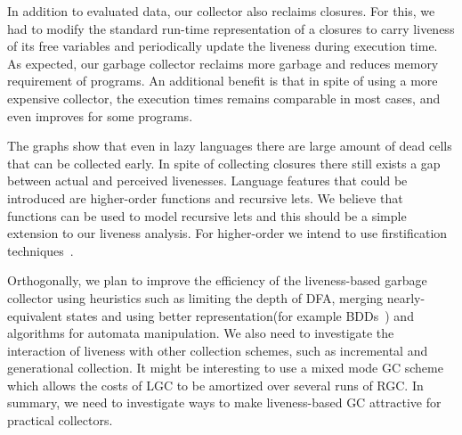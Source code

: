 \documentclass[9pt]{sigplanconf}
\begin{document}
In addition to  evaluated data, our collector  also reclaims closures.
For this, we  had to modify the standard run-time  representation of a
closures  to carry  liveness  of its free  variables and  periodically
update the liveness during execution  time.  As expected, our garbage
collector  reclaims more  garbage and  reduces memory  requirement of
programs.  An  additional benefit is  that in  spite of using  a more
expensive collector, the execution times remains comparable in
most cases, and even improves for some programs.


The graphs show that even in lazy languages there are large amount of
dead cells that can be collected early. In spite of collecting
closures there still exists a gap between actual and perceived
livenesses.
Language features that could be introduced are higher-order functions
and recursive lets. We believe that functions can be used to model
recursive lets and this should be a simple extension to our liveness
analysis.
For higher-order we intend to use firstification techniques~\cite{Mitchell:2009}. 
 

  Orthogonally, we  plan to  improve the  efficiency of
  the liveness-based garbage collector using heuristics
  such   as  limiting   the  depth   of  DFA,   merging
  nearly-equivalent    states    and    using    better
  representation(for example BDDs~\cite{Bryant86})    and    algorithms   for    automata
  manipulation.  We   also  need  to   investigate  the
  interaction   of  liveness   with  other   collection
  schemes,   such  as   incremental  and   generational
  collection.  It might be interesting to use a mixed mode GC
  scheme which allows the costs of LGC to be amortized over several runs
  of RGC. In summary, we  need to investigate ways
  to make liveness-based GC attractive
  for practical collectors.


\clearpage
\balance
{}

\clearpage
\end{document}
